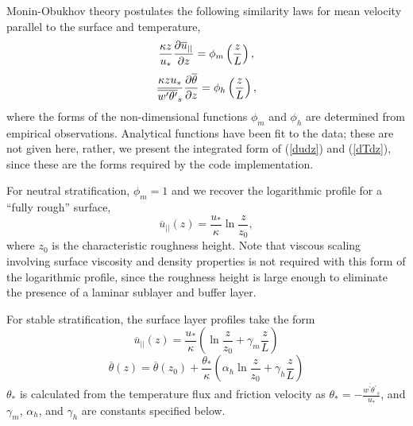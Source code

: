 Monin-Obukhov theory postulates the following similarity laws for mean
velocity parallel to the surface and temperature,
\begin{equation} \label{dudz}
\frac{\kappa z}{u_*}\frac{\partial{\overline{u}_{||}}}{\partial{z}} =
\phi_m\left(\frac{z}{L}\right),
\end{equation}
\begin{equation} \label{dTdz}
\frac{\kappa z u_*}{\overline{w^\prime \theta^\prime}_s}
\frac{\partial{\overline{\theta}}}{\partial{z}} = \phi_h\left(\frac{z}{L}\right),
\end{equation}
where the forms of the non-dimensional functions $\phi_m$ and $\phi_h$ are determined
from empirical observations. Analytical functions have been fit to the
data; these are not given here, rather, we present the integrated form
of (\ref{dudz}) and (\ref{dTdz}), since these are the forms required
by the code implementation.

For neutral stratification, $\phi_m = 1$ and we recover the
logarithmic profile for a ``fully rough'' surface,
\begin{equation} \label{vel_neutral}
\overline{u}_{||}(z) = \frac{u_*}{\kappa}\ln\frac{z}{z_0},
\end{equation}
where $z_0$ is the characteristic roughness height.  Note that viscous
scaling involving surface viscosity and density properties is not
required with this form of the logarithmic profile, since the
roughness height is large enough to eliminate the presence of a
laminar sublayer and buffer layer.

For stable stratification, the surface layer profiles take the form
\begin{equation} \label{vel_stable}
 \overline{u}_{||}(z) = \frac{u_*}{\kappa}\left(\ln\frac{z}{z_0} +
 \gamma_m\frac{z}{L}\right)
\end{equation}
\begin{equation}  \label{temp_stable}
\overline{\theta}(z) = \overline{\theta}(z_0) +
\frac{\theta_*}{\kappa} \left(\alpha_h\ln\frac{z}{z_0} +
\gamma_h\frac{z}{L}\right)
\end{equation}
$\theta_*$ is calculated from the temperature flux and friction velocity as
$\theta_* = -\frac{\overline{w^\prime \theta^\prime}_s}{u_*}$, and
$\gamma_m$, $\alpha_h$, and $\gamma_h$ are constants specified below.

